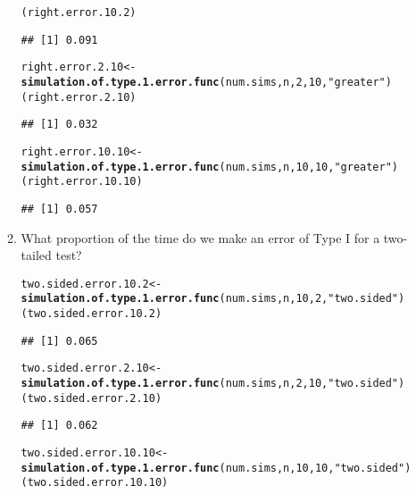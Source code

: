 \documentclass{article}\usepackage[]{graphicx}\usepackage[]{xcolor}
\makeatletter
\newcommand{\hlnum}[1]{\textcolor[rgb]{0.686,0.059,0.569}{#1}}%
\newcommand{\hlsng}[1]{\textcolor[rgb]{0.192,0.494,0.8}{#1}}%
\newcommand{\hldef}[1]{\textcolor[rgb]{0.345,0.345,0.345}{#1}}%
\newcommand{\hlkwb}[1]{\textcolor[rgb]{0.69,0.353,0.396}{#1}}%
\newcommand{\hlkwd}[1]{\textcolor[rgb]{0.737,0.353,0.396}{\textbf{#1}}}%
\newenvironment{kframe}{%
 \def\at@end@of@kframe{}%
 \ifinner\ifhmode%
  \def\at@end@of@kframe{\end{minipage}}%
  \begin{minipage}{\columnwidth}%
 \fi\fi%
 \def\FrameCommand##1{\hskip\@totalleftmargin \hskip-\fboxsep
 \colorbox{shadecolor}{##1}\hskip-\fboxsep
     \hskip-\linewidth \hskip-\@totalleftmargin \hskip\columnwidth}%
 \MakeFramed {\advance\hsize-\width
   \@totalleftmargin\z@ \linewidth\hsize
   \@setminipage}}%
 {\par\unskip\endMakeFramed%
 \at@end@of@kframe}
\newenvironment{knitrout}{}{} %
\makeatother
\begin{document}
\begin{enumerate}
\begin{enumerate}
\begin{knitrout}
\begin{kframe}
\begin{alltt}
  \hldef{(right.error.10.2)}
\end{alltt}
\begin{verbatim}
## [1] 0.091
\end{verbatim}
\begin{alltt}
  \hldef{right.error.2.10} \hlkwb{<-} \hlkwd{simulation.of.type.1.error.func}\hldef{(num.sims,n,} \hlnum{2}\hldef{,} \hlnum{10}\hldef{,} \hlsng{"greater"}\hldef{)}
  \hldef{(right.error.2.10)}
\end{alltt}
\begin{verbatim}
## [1] 0.032
\end{verbatim}
\begin{alltt}
  \hldef{right.error.10.10} \hlkwb{<-} \hlkwd{simulation.of.type.1.error.func}\hldef{(num.sims,n,} \hlnum{10}\hldef{,}\hlnum{10}\hldef{,}\hlsng{"greater"}\hldef{)}
  \hldef{(right.error.10.10)}
\end{alltt}
\begin{verbatim}
## [1] 0.057
\end{verbatim}
\end{kframe}
\end{knitrout}
    \item What proportion of the time do we make an error of Type I for a
    two-tailed test?
\begin{knitrout}
\color{fgcolor}\begin{kframe}
\begin{alltt}
\hldef{two.sided.error.10.2} \hlkwb{<-} \hlkwd{simulation.of.type.1.error.func}\hldef{(num.sims,n,} \hlnum{10}\hldef{,}\hlnum{2}\hldef{,}\hlsng{"two.sided"}\hldef{)}
  \hldef{(two.sided.error.10.2)}
\end{alltt}
\begin{verbatim}
## [1] 0.065
\end{verbatim}
\begin{alltt}
  \hldef{two.sided.error.2.10} \hlkwb{<-} \hlkwd{simulation.of.type.1.error.func}\hldef{(num.sims,n,} \hlnum{2}\hldef{,}\hlnum{10}\hldef{,} \hlsng{"two.sided"}\hldef{)}
  \hldef{(two.sided.error.2.10)}
\end{alltt}
\begin{verbatim}
## [1] 0.062
\end{verbatim}
\begin{alltt}
  \hldef{two.sided.error.10.10} \hlkwb{<-} \hlkwd{simulation.of.type.1.error.func}\hldef{(num.sims,n,} \hlnum{10}\hldef{,}\hlnum{10}\hldef{,} \hlsng{"two.sided"}\hldef{)}
  \hldef{(two.sided.error.10.10)}
\end{alltt}

\end{kframe}
\end{knitrout}
\end{enumerate}
\end{enumerate}
\end{document}
